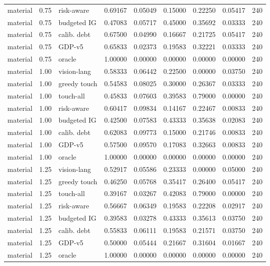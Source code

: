 \documentclass{article}
\begin{document}
\begin{center}
\begin{longtable}{lllllllll}
material & 0.75 & risk-aware & 0.69167 & 0.05049 & 0.15000 & 0.22250 & 0.05417 & 240 \\
material & 0.75 & budgeted IG & 0.47083 & 0.05717 & 0.45000 & 0.35692 & 0.03333 & 240 \\
material & 0.75 & calib. debt & 0.67500 & 0.04990 & 0.16667 & 0.21725 & 0.05417 & 240 \\
material & 0.75 & GDP-v5 & 0.65833 & 0.02373 & 0.19583 & 0.32221 & 0.03333 & 240 \\
material & 0.75 & oracle & 1.00000 & 0.00000 & 0.00000 & 0.00000 & 0.00000 & 240 \\
material & 1.00 & vision-lang & 0.58333 & 0.06442 & 0.22500 & 0.00000 & 0.03750 & 240 \\
material & 1.00 & greedy touch & 0.54583 & 0.08025 & 0.30000 & 0.26367 & 0.03333 & 240 \\
material & 1.00 & touch-all & 0.45833 & 0.07603 & 0.39583 & 0.79000 & 0.00000 & 240 \\
material & 1.00 & risk-aware & 0.60417 & 0.09834 & 0.14167 & 0.22467 & 0.00833 & 240 \\
material & 1.00 & budgeted IG & 0.42500 & 0.07583 & 0.43333 & 0.35638 & 0.02083 & 240 \\
material & 1.00 & calib. debt & 0.62083 & 0.09773 & 0.15000 & 0.21746 & 0.00833 & 240 \\
material & 1.00 & GDP-v5 & 0.57500 & 0.09570 & 0.17083 & 0.32663 & 0.00833 & 240 \\
material & 1.00 & oracle & 1.00000 & 0.00000 & 0.00000 & 0.00000 & 0.00000 & 240 \\
material & 1.25 & vision-lang & 0.52917 & 0.05586 & 0.23333 & 0.00000 & 0.05000 & 240 \\
material & 1.25 & greedy touch & 0.46250 & 0.05768 & 0.35417 & 0.26400 & 0.05417 & 240 \\
material & 1.25 & touch-all & 0.39167 & 0.03267 & 0.42083 & 0.79000 & 0.00000 & 240 \\
material & 1.25 & risk-aware & 0.56667 & 0.06349 & 0.19583 & 0.22208 & 0.02917 & 240 \\
material & 1.25 & budgeted IG & 0.39583 & 0.03278 & 0.43333 & 0.35613 & 0.03750 & 240 \\
material & 1.25 & calib. debt & 0.55833 & 0.06111 & 0.19583 & 0.21571 & 0.03750 & 240 \\
material & 1.25 & GDP-v5 & 0.50000 & 0.05444 & 0.21667 & 0.31604 & 0.01667 & 240 \\
material & 1.25 & oracle & 1.00000 & 0.00000 & 0.00000 & 0.00000 & 0.00000 & 240 \\

\end{longtable}
\end{center}
\end{document}
